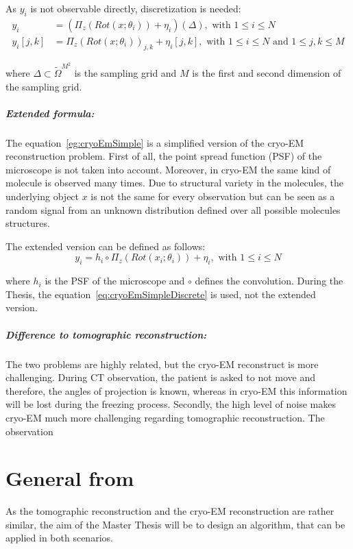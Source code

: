 As $y_i$ is not observable directly, discretization is needed:
\begin{equation}
    \label{eg:cryoEmSimpleDiscrete}
    \begin{aligned}
        y_i &= \left( \Pi_z ( Rot (x; \theta_i)) + \eta_i\right)(\Delta), \text{ with } 1 \leq i \leq N \\
        y_i[j,k] &= \Pi_z ( Rot(x; \theta_i))_{j,k} + \eta_i[j,k], \text{ with } 1 \leq i \leq N \text{ and } 1 \leq j,k \leq M    
    \end{aligned}
\end{equation}

where $\Delta \subset \tilde{\Omega}^{M^2}$ is the sampling grid and $M$ is the first and second dimension of the sampling grid.


\subparagraph{Extended formula:} 
The equation~\ref{eg:cryoEmSimple} is a simplified version of the cryo-EM reconstruction problem.
First of all, the point spread function (PSF) of the microscope is not taken into account.
Moreover, in cryo-EM the same kind of molecule is observed many times.
Due to structural variety in the molecules, the underlying object $x$ is not the same 
for every observation but can be seen as a random signal from an unknown distribution defined over all possible molecules structures.

The extended version can be defined as follows:
\begin{equation}
    \label{eg:cryoEmExtended}
    y_i = h_i \circ \Pi_z ( Rot (x_i; \theta_i)) + \eta_i, \text{ with } 1 \leq i \leq N
\end{equation}

where $h_i$ is the PSF of the microscope and $\circ$ defines the convolution. 
During the Thesis, the equation~\ref{eq:cryoEmSimpleDiscrete} is used, not the extended version.

\subparagraph{Difference to tomographic reconstruction:}
The two problems are highly related, but the cryo-EM reconstruct is more challenging.
During CT observation, the patient is asked to not move and therefore, the angles of projection is known, whereas
in cryo-EM this information will be lost during the freezing process.
Secondly, the high level of noise makes cryo-EM much more challenging regarding tomographic reconstruction.
The observation 


\section{General from}
As the tomographic reconstruction and the cryo-EM reconstruction are rather similar, 
the aim of the Master Thesis will be to design an algorithm, that can be applied in both scenarios.

